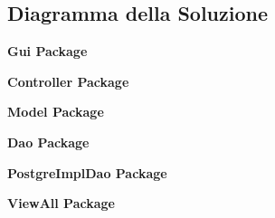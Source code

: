 \newpage
\subsection{Diagramma della Soluzione}


\bigskip
\begin{center}
	\textbf{Gui Package}
\end{center}
\bigskip

\begin{figure}[h]
	
\end{figure}

\newpage


\bigskip
\begin{center}
	\textbf{Controller Package}
\end{center}
\bigskip

\begin{figure}[h]
	
\end{figure}

\newpage

\bigskip
\begin{center}
	\textbf{Model Package}
\end{center}
\bigskip

\begin{figure}[h]
	
\end{figure}

\newpage

\bigskip
\begin{center}
	\textbf{Dao Package}
\end{center}
\bigskip

\begin{figure}[h]
	
\end{figure}

\newpage

\bigskip
\begin{center}
	\textbf{PostgreImplDao Package}
\end{center}
\bigskip

\begin{figure}[h]
	
\end{figure}

\newpage

\bigskip
\begin{center}
	\textbf{ViewAll Package}
\end{center}
\bigskip

